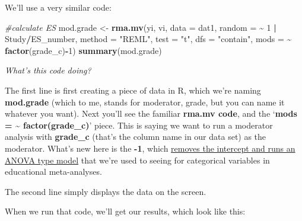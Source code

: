 \documentclass[
]{book}
\newenvironment{Shaded}{\begin{snugshade}}{\end{snugshade}}
\newcommand{\AttributeTok}[1]{\textcolor[rgb]{0.13,0.29,0.53}{#1}}
\newcommand{\CommentTok}[1]{\textcolor[rgb]{0.56,0.35,0.01}{\textit{#1}}}
\newcommand{\DecValTok}[1]{\textcolor[rgb]{0.00,0.00,0.81}{#1}}
\newcommand{\FunctionTok}[1]{\textcolor[rgb]{0.13,0.29,0.53}{\textbf{#1}}}
\newcommand{\NormalTok}[1]{#1}
\newcommand{\OtherTok}[1]{\textcolor[rgb]{0.56,0.35,0.01}{#1}}
\newcommand{\SpecialCharTok}[1]{\textcolor[rgb]{0.81,0.36,0.00}{\textbf{#1}}}
\newcommand{\StringTok}[1]{\textcolor[rgb]{0.31,0.60,0.02}{#1}}
\begin{document}
We'll use a very similar code:

\begin{Shaded}
\begin{Highlighting}[]
\CommentTok{\#calculate ES}
\NormalTok{mod.grade }\OtherTok{\textless{}{-}} \FunctionTok{rma.mv}\NormalTok{(yi,}
\NormalTok{                    vi,}
                    \AttributeTok{data =}\NormalTok{ dat1,}
                    \AttributeTok{random =} \SpecialCharTok{\textasciitilde{}} \DecValTok{1} \SpecialCharTok{|}\NormalTok{ Study}\SpecialCharTok{/}\NormalTok{ES\_number, }
                    \AttributeTok{method =} \StringTok{"REML"}\NormalTok{,}
                    \AttributeTok{test =} \StringTok{"t"}\NormalTok{,}
                    \AttributeTok{dfs =} \StringTok{"contain"}\NormalTok{,}
                    \AttributeTok{mods =} \SpecialCharTok{\textasciitilde{}} \FunctionTok{factor}\NormalTok{(grade\_c)}\SpecialCharTok{{-}}\DecValTok{1}\NormalTok{)}
\FunctionTok{summary}\NormalTok{(mod.grade)}
\end{Highlighting}
\end{Shaded}

\emph{What's this code doing?}

The first line is first creating a piece of data in R, which we're naming \textbf{mod.grade} (which to me, stands for moderator, grade, but you can name it whatever you want). Next you'll see the familiar \textbf{rma.mv code}, and the `\textbf{mods = \textasciitilde{} factor(grade\_c)}' piece. This is saying we want to run a moderator analysis with \textbf{grade\_c} (that's the column name in our data set) as the moderator. What's new here is the \textbf{-1}, which \ul{removes the intercept and runs an ANOVA type model} that we're used to seeing for categorical variables in educational meta-analyses.

The second line simply displays the data on the screen.

When we run that code, we'll get our results, which look like this:
\end{document}
